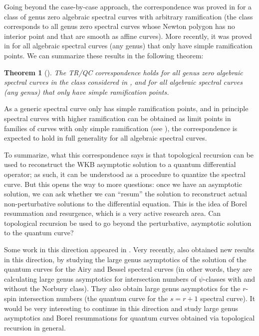 \documentclass[reqno,oneside,11pt]{amsart}
\theoremstyle{plain}
\newtheorem{theorem}{Theorem}[section]
\theoremstyle{definition}
\theoremstyle{remark}
\numberwithin{equation}{section}
\begin{document}
 Going beyond the case-by-case approach, the correspondence was proved in \cite{BE17} for a class of genus zero algebraic spectral curves with arbitrary ramification (the class corresponds to all genus zero spectral curves whose Newton polygon has no interior point and that are smooth as affine curves). More recently, it was proved in \cite{EGMO21} for all algebraic spectral curves (any genus) that only have simple ramification points. We can summarize these results in the following theorem:
\begin{theorem}[\cite{BE17,EGMO21}]
The TR/QC correspondence holds for all genus zero algebraic spectral curves in the class considered in \cite{BE17}, and for all algebraic spectral curves (any genus) that only have simple ramification points.
\end{theorem}
As a generic spectral curve only has simple ramification points, and in principle spectral curves with higher ramification can be obtained as limit points in families of curves with only simple ramification (see \cite{BBCKS23}), the correspondence is expected to hold in full generality for all algebraic spectral curves.

To summarize, what this correspondence says is that topological recursion can be used to reconstruct the WKB asymptotic solution to a quantum differential operator; as such, it can be understood as a procedure to quantize the spectral curve. But this opens the way to more questions: once we have an asymptotic solution, we can ask whether we can ``resum'' the solution to reconstruct actual non-perturbative solutions to the differential equation. This is the idea of Borel resummation and resurgence, which is a very active research area. Can topological recursion be used to go beyond the perturbative, asymptotic solution to the quantum curve?

Some work in this direction appeared in \cite{IK21,IM23}. Very recently, \cite{EGGGL23} also obtained new results in this direction, by studying the large genus asymptotics of the solution of the quantum curves for the Airy and Bessel spectral curves (in other words, they are calculating large genus asymptotics for intersection numbers of $\psi$-classes with and without the Norbury class). They also obtain large genus asymptotics for the $r$-spin intersection numbers (the quantum curve for the $s=r+1$ spectral curve). It would be very interesting to continue in this direction and study large genus asymptotics and Borel resummations for quantum curves obtained via topological recursion in general.


{\setlength\emergencystretch{\hsize}}

\printbibliography
\end{document}
